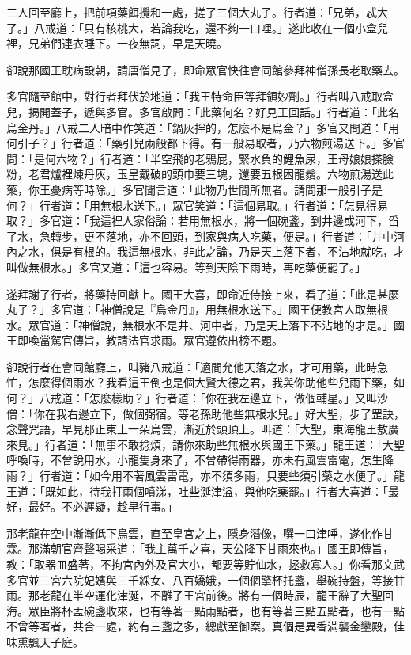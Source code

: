 三人回至廳上，把前項藥餌攪和一處，搓了三個大丸子。行者道：「兄弟，忒大了。」八戒道：「只有核桃大，若論我吃，還不夠一口哩。」遂此收在一個小盒兒裡，兄弟們連衣睡下。一夜無詞，早是天曉。

卻說那國王耽病設朝，請唐僧見了，即命眾官快往會同館參拜神僧孫長老取藥去。

多官隨至館中，對行者拜伏於地道：「我王特命臣等拜領妙劑。」行者叫八戒取盒兒，揭開蓋子，遞與多官。多官啟問：「此藥何名？好見王回話。」行者道：「此名烏金丹。」八戒二人暗中作笑道：「鍋灰拌的，怎麼不是烏金？」多官又問道：「用何引子？」行者道：「藥引兒兩般都下得。有一般易取者，乃六物煎湯送下。」多官問：「是何六物？」行者道：「半空飛的老鴉屁，緊水負的鯉魚尿，王母娘娘搽臉粉，老君爐裡煉丹灰，玉皇戴破的頭巾要三塊，還要五根困龍鬚。六物煎湯送此藥，你王憂病等時除。」多官聞言道：「此物乃世間所無者。請問那一般引子是何？」行者道：「用無根水送下。」眾官笑道：「這個易取。」行者道：「怎見得易取？」多官道：「我這裡人家俗論：若用無根水，將一個碗盞，到井邊或河下，舀了水，急轉步，更不落地，亦不回頭，到家與病人吃藥，便是。」行者道：「井中河內之水，俱是有根的。我這無根水，非此之論，乃是天上落下者，不沾地就吃，才叫做無根水。」多官又道：「這也容易。等到天陰下雨時，再吃藥便罷了。」

遂拜謝了行者，將藥持回獻上。國王大喜，即命近侍接上來，看了道：「此是甚麼丸子？」多官道：「神僧說是『烏金丹』，用無根水送下。」國王便教宮人取無根水。眾官道：「神僧說，無根水不是井、河中者，乃是天上落下不沾地的才是。」國王即喚當駕官傳旨，教請法官求雨。眾官遵依出榜不題。

卻說行者在會同館廳上，叫豬八戒道：「適間允他天落之水，才可用藥，此時急忙，怎麼得個雨水？我看這王倒也是個大賢大德之君，我與你助他些兒雨下藥，如何？」八戒道：「怎麼樣助？」行者道：「你在我左邊立下，做個輔星。」又叫沙僧：「你在我右邊立下，做個弼宿。等老孫助他些無根水兒。」好大聖，步了罡訣，念聲咒語，早見那正東上一朵烏雲，漸近於頭頂上。叫道：「大聖，東海龍王敖廣來見。」行者道：「無事不敢捻煩，請你來助些無根水與國王下藥。」龍王道：「大聖呼喚時，不曾說用水，小龍隻身來了，不曾帶得雨器，亦未有風雲雷電，怎生降雨？」行者道：「如今用不著風雲雷電，亦不須多雨，只要些須引藥之水便了。」龍王道：「既如此，待我打兩個噴涕，吐些涎津溢，與他吃藥罷。」行者大喜道：「最好，最好。不必遲疑，趁早行事。」

那老龍在空中漸漸低下烏雲，直至皇宮之上，隱身潛像，噀一口津唾，遂化作甘霖。那滿朝官齊聲喝采道：「我主萬千之喜，天公降下甘雨來也。」國王即傳旨，教：「取器皿盛著，不拘宮內外及官大小，都要等貯仙水，拯救寡人。」你看那文武多官並三宮六院妃嬪與三千綵女、八百嬌娥，一個個擎杯托盞，舉碗持盤，等接甘雨。那老龍在半空運化津涎，不離了王宮前後。將有一個時辰，龍王辭了大聖回海。眾臣將杯盂碗盞收來，也有等著一點兩點者，也有等著三點五點者，也有一點不曾等著者，共合一處，約有三盞之多，總獻至御案。真個是異香滿襲金鑾殿，佳味熏飄天子庭。

